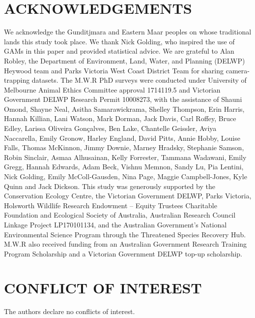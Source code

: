 \documentclass[]{elsarticle} %
\begin{document}
\newpage

\hypertarget{acknowledgements}{%
\section*{ACKNOWLEDGEMENTS}\label{acknowledgements}}

We acknowledge the Gunditjmara and Eastern Maar peoples on whose traditional lands this study took place. We thank Nick Golding, who inspired the use of GAMs in this paper and provided statistical advice. We are grateful to Alan Robley, the Department of Environment, Land, Water, and Planning (DELWP) Heywood team and Parks Victoria West Coast District Team for sharing camera-trapping datasets. The M.W.R PhD surveys were conducted under University of Melbourne Animal Ethics Committee approval 1714119.5 and Victorian Government DELWP Research Permit 10008273, with the assistance of Shauni Omond, Shayne Neal, Asitha Samarawickrama, Shelley Thompson, Erin Harris, Hannah Killian, Lani Watson, Mark Dorman, Jack Davis, Carl Roffey, Bruce Edley, Larissa Oliveira Gonçalves, Ben Lake, Chantelle Geissler, Aviya Naccarella, Emily Gronow, Harley England, David Pitts, Annie Hobby, Louise Falls, Thomas McKinnon, Jimmy Downie, Marney Hradsky, Stephanie Samson, Robin Sinclair, Asmaa Alhusainan, Kelly Forrester, Tammana Wadawani, Emily Gregg, Hannah Edwards, Adam Beck, Vishnu Memnon, Sandy Lu, Pia Lentini, Nick Golding, Emily McColl-Gausden, Nina Page, Maggie Campbell-Jones, Kyle Quinn and Jack Dickson. This study was generously supported by the Conservation Ecology Centre, the Victorian Government DELWP, Parks Victoria, Holsworth Wildlife Research Endowment -- Equity Trustees Charitable Foundation and Ecological Society of Australia, Australian Research Council Linkage Project LP170101134, and the Australian Government's National Environmental Science Program through the Threatened Species Recovery Hub. M.W.R also received funding from an Australian Government Research Training Program Scholarship and a Victorian Government DELWP top-up scholarship.

\hypertarget{conflict-of-interest}{%
\section*{CONFLICT OF INTEREST}\label{conflict-of-interest}}

The authors declare no conflicts of interest.
\end{document}
